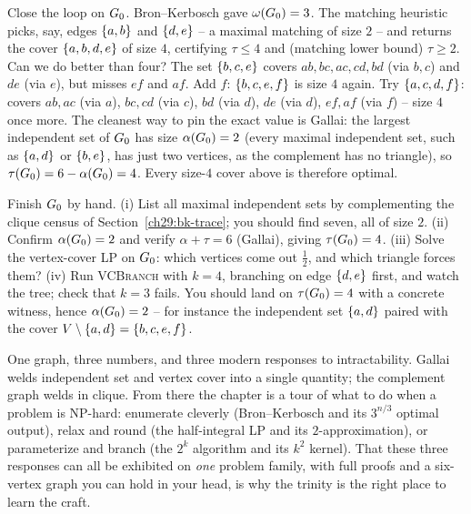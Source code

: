 Close the loop on $G_0$. Bron--Kerbosch gave $\omega(G_0)=3$. The matching
heuristic picks, say, edges $\{a,b\}$ and $\{d,e\}$ -- a maximal matching of
size $2$ -- and returns the cover $\{a,b,d,e\}$ of size $4$, certifying
$\tau\le4$ and (matching lower bound) $\tau\ge2$. Can we do better than four? The
set $\{b,c,e\}$ covers $ab,bc,ac,cd,bd$ (via $b,c$) and $de$ (via $e$), but
misses $ef$ and $af$. Add $f$: $\{b,c,e,f\}$ is size $4$ again. Try
$\{a,c,d,f\}$: covers $ab,ac$ (via $a$), $bc,cd$ (via $c$), $bd$ (via $d$),
$de$ (via $d$), $ef,af$ (via $f$) -- size $4$ once more. The cleanest way to pin
the exact value is Gallai: the largest independent set of $G_0$ has size
$\alpha(G_0)=2$ (every maximal independent set, such as $\{a,d\}$ or
$\{b,e\}$, has just two vertices, as the complement has no triangle), so
$\tau(G_0)=6-\alpha(G_0)=4$. Every size-$4$ cover above is therefore
optimal.

\begin{labbox}
Finish $G_0$ by hand. (i) List all maximal independent sets by complementing
the clique census of Section~\ref{ch29:bk-trace}; you should find seven, all of
size $2$. (ii) Confirm $\alpha(G_0)=2$ and verify $\alpha+\tau=6$ (Gallai),
giving $\tau(G_0)=4$. (iii) Solve the vertex-cover LP on $G_0$: which
vertices come out $\tfrac12$, and which triangle forces them? (iv) Run
\textsc{VCBranch} with $k=4$, branching on edge $\{d,e\}$ first, and watch the
tree; check that $k=3$ fails. You should land on $\tau(G_0)=4$ with a concrete
witness, hence $\alpha(G_0)=2$ -- for instance the independent set $\{a,d\}$
paired with the cover $V\setminus\{a,d\}=\{b,c,e,f\}$.
\end{labbox}

\begin{aestheticbox}
One graph, three numbers, and three modern responses to intractability. Gallai
welds independent set and vertex cover into a single quantity; the complement
graph welds in clique. From there the chapter is a tour of what to do when a
problem is NP-hard: enumerate cleverly (Bron--Kerbosch and its $3^{n/3}$ optimal
output), relax and round (the half-integral LP and its $2$-approximation), or
parameterize and branch (the $2^k$ algorithm and its $k^2$ kernel). That these
three responses can all be exhibited on \emph{one} problem family, with full
proofs and a six-vertex graph you can hold in your head, is why the trinity is the
right place to learn the craft.
\end{aestheticbox}

